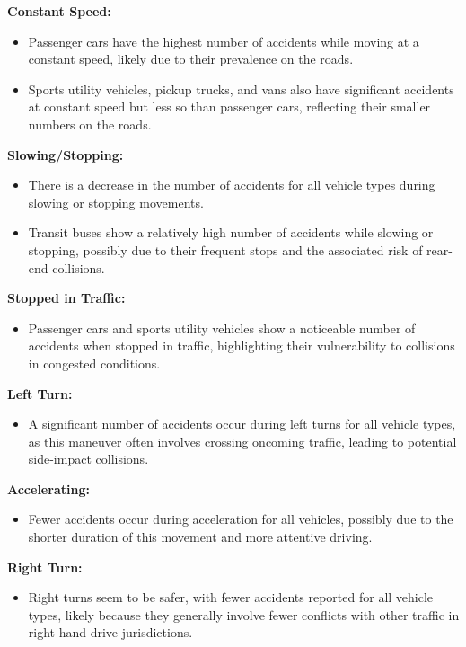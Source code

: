 \documentclass[conference]{IEEEtran}
\begin{document}
\begin{enumerate}
\begin{figure}
\end{figure}

\textbf{Constant Speed:}
\begin{itemize}
    \item Passenger cars have the highest number of accidents while moving at a constant speed, likely due to their prevalence on the roads.
    \item Sports utility vehicles, pickup trucks, and vans also have significant accidents at constant speed but less so than passenger cars, reflecting their smaller numbers on the roads.
\end{itemize}

\textbf{Slowing/Stopping:}
\begin{itemize}
    \item There is a decrease in the number of accidents for all vehicle types during slowing or stopping movements.
    \item Transit buses show a relatively high number of accidents while slowing or stopping, possibly due to their frequent stops and the associated risk of rear-end collisions.
\end{itemize}

\textbf{Stopped in Traffic:}
\begin{itemize}
    \item Passenger cars and sports utility vehicles show a noticeable number of accidents when stopped in traffic, highlighting their vulnerability to collisions in congested conditions.
\end{itemize}

\textbf{Left Turn:}
\begin{itemize}
    \item A significant number of accidents occur during left turns for all vehicle types, as this maneuver often involves crossing oncoming traffic, leading to potential side-impact collisions.
\end{itemize}

\textbf{Accelerating:}
\begin{itemize}
    \item Fewer accidents occur during acceleration for all vehicles, possibly due to the shorter duration of this movement and more attentive driving.
\end{itemize}

\textbf{Right Turn:}
\begin{itemize}
    \item Right turns seem to be safer, with fewer accidents reported for all vehicle types, likely because they generally involve fewer conflicts with other traffic in right-hand drive jurisdictions.
\end{itemize}


\end{enumerate}
\end{document}
